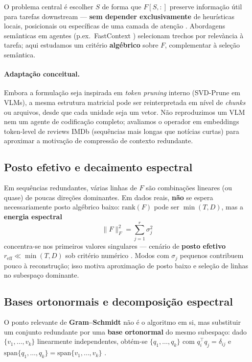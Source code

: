 O problema central é escolher $S$ de forma que $F[S,:]$ preserve informação útil para tarefas downstream --- \textbf{sem depender exclusivamente} de heurísticas locais, posicionais ou específicas de uma camada de atenção \cite{apedo2026svdprune}. Abordagens semânticas em agentes (p.ex.\ FastContext \cite{zhang2026fastcontext}) selecionam trechos por relevància à tarefa; aqui estudamos um critério \textbf{algébrico} sobre $F$, complementar à seleção semântica.

\paragraph{Adaptação conceitual.}
Embora a formulação seja inspirada em \emph{token pruning} interno (SVD-Prune em VLMs), a mesma estrutura matricial pode ser reinterpretada em nível de \emph{chunks} ou arquivos, desde que cada unidade seja um vetor. Não reproduzimos um VLM nem um agente de codificação completo; avaliamos o operador em embeddings token-level de reviews IMDb (sequências mais longas que notícias curtas) para aproximar a motivação de compressão de contexto redundante.

\subsection{Posto efetivo e decaimento espectral}

Em sequências redundantes, várias linhas de $F$ são combinações lineares (ou quase) de poucas direções dominantes. Em dados reais, \textbf{não} se espera necessariamente posto algébrico baixo: $\mathrm{rank}(F)$ pode ser $\min(T,D)$, mas a \textbf{energia espectral}
$$
\|F\|_F^2 = \sum_{j=1}^{r} \sigma_j^2
$$
concentra-se nos primeiros valores singulares --- cenário de \textbf{posto efetivo} $r_{\mathrm{eff}} \ll \min(T,D)$ sob critério numérico \cite{alcposto,alc21svd}. Modos com $\sigma_j$ pequenos contribuem pouco à reconstrução; isso motiva aproximação de posto baixo e seleção de linhas no subespaço dominante.

\subsection{Bases ortonormais e decomposição espectral}

O ponto relevante de \textbf{Gram--Schmidt} \cite{alc11base} não é o algoritmo em si, mas substituir um conjunto redundante por uma \textbf{base ortonormal} do mesmo subespaço: dado $\{v_1,\ldots,v_k\}$ linearmente independentes, obtém-se $\{q_1,\ldots,q_k\}$ com $q_i^\top q_j = \delta_{ij}$ e $\mathrm{span}\{q_1,\ldots,q_k\} = \mathrm{span}\{v_1,\ldots,v_k\}$ \cite{alc04produto}.

